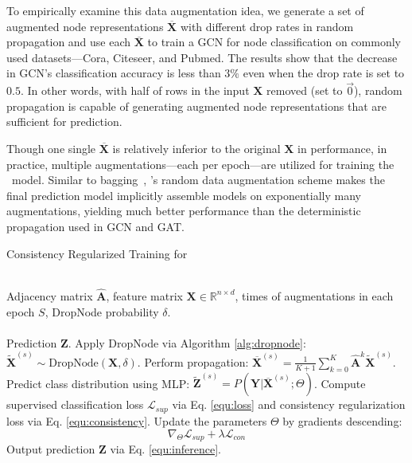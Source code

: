 {To empirically examine this data augmentation idea, we generate a set of augmented node representations $\overline{\mathbf{X}}$ with different drop rates in random propagation and use each $\overline{\mathbf{X}}$ to train a GCN for node classification on commonly used datasets---Cora, Citeseer, and Pubmed.  The results show that the decrease in GCN's classification accuracy is less than $3\%$ even when the drop rate is set to $0.5$. 
In other words, with half of rows in the input $\mathbf{X}$ removed (set to $\vec{0}$), random propagation is capable of generating augmented node representations that are sufficient for prediction. 


Though one single $\overline{\mathbf{X}}$ is relatively inferior to the original $\mathbf{X}$ in performance, in practice, multiple augmentations---each per epoch---are utilized for training the \model\ model. 
Similar to bagging~\cite{breiman1996bagging}, \model's random data augmentation scheme makes the final prediction model implicitly assemble models on exponentially many augmentations, yielding much better performance than the deterministic propagation used in GCN and GAT.





 
 \begin{algorithm}[tb]
\caption{Consistency Regularized Training for \model}
\small
\label{alg:2}
\begin{algorithmic}[1] \REQUIRE ~~\\
 Adjacency matrix $\hat{\mathbf{A}}$,
feature matrix $\mathbf{X} \in \mathbb{R}^{n \times d}$, 
times of augmentations in each epoch $S$, DropNode probability $\delta$.\\
\ENSURE ~~\\
Prediction $\mathbf{Z}$. 
\STATE Apply DropNode via Algorithm \ref{alg:dropnode}: $
\widetilde{\mathbf{X}}^{(s)} \sim \text{DropNode}(\mathbf{X},\delta)$. 
\STATE Perform propagation: $\overline{\mathbf{X}}^{(s)} = \frac{1}{K+1}\sum_{k=0}^K\hat{\mathbf{A}}^k \widetilde{\mathbf{X}}^{(s)}$.
\STATE Predict class distribution using MLP: $\widetilde{\mathbf{Z}}^{(s)} = P(\mathbf{Y}|\overline{\mathbf{X}}^{(s)};\Theta)$.
\ENDFOR
\STATE Compute supervised classification loss $\mathcal{L}_{sup}$ via Eq. \ref{equ:loss} and consistency regularization loss via Eq. \ref{equ:consistency}.
\STATE Update the parameters $\Theta$ by gradients descending:
$$\nabla_\Theta \mathcal{L}_{sup} + \lambda \mathcal{L}_{con}$$
\ENDWHILE
\STATE Output prediction $\mathbf{Z}$ via Eq. \ref{equ:inference}.
\end{algorithmic}
\end{algorithm}

}
